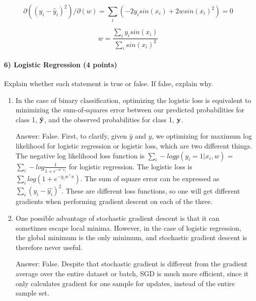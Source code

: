 \documentclass[11pt]{article}
\newcommand{\vy}{{\bf y}}
\begin{document}
		\begin{equation*}
		\partial{((y_i - \hat{y}_i) ^2)}/\partial(w)
		= \sum_i (-2 y_i sin(x_i)+ 2 w sin(x_i)^2) = 0
		\end{equation*}
		
		\begin{equation*}
		w = \frac{\sum_i y_i sin(x_i)} { \sum_i sin(x_i)^2}
		\end{equation*}
		
		
	
	\paragraph{6) Logistic Regression (4 points)} Explain whether each statement is true or false. If false, explain why.
	\begin{enumerate}
		\item In the case of binary classification, optimizing the logistic loss is equivalent to minimizing the sum-of-squares error between our predicted probabilities for class 1, $\hat{\vy}$, and the observed probabilities for class 1, $\vy$.\newline
		
		Answer: False. First, to clarify, given $\hat{y}$ and $y$, we optimizing for maximum log likelihood for logistic regression or logistic loss, which are two different things. The negative log likelihood loss function is $\sum_i - log p(y_i = 1 | x_i, w)$ = $\sum_i - log \frac {1} {1 + e^{ - w^\intercal x_i}}$ for logistic regression. The logistic loss is $\sum_i log(1 + e^{-y_i w^\intercal x})$. The sum of square error can be expressed as $\sum_i (y_i - \hat{y_i})^2$. These are different loss functions, so one will get different gradients when performing gradient descent on each of the three.
		
		\item One possible advantage of stochastic gradient descent is that it can sometimes escape local minima. However, in the case of logistic regression, the global minimum is the only minimum, and stochastic gradient descent is therefore never useful.\newline
		
		Answer: False. Despite that stochastic gradient is different from the gradient average over the entire dataset or batch, SGD is much more efficient, since it only calculates gradient for one sample for updates, instead of the entire sample set. 	
	\end{enumerate}
	
\end{document}
